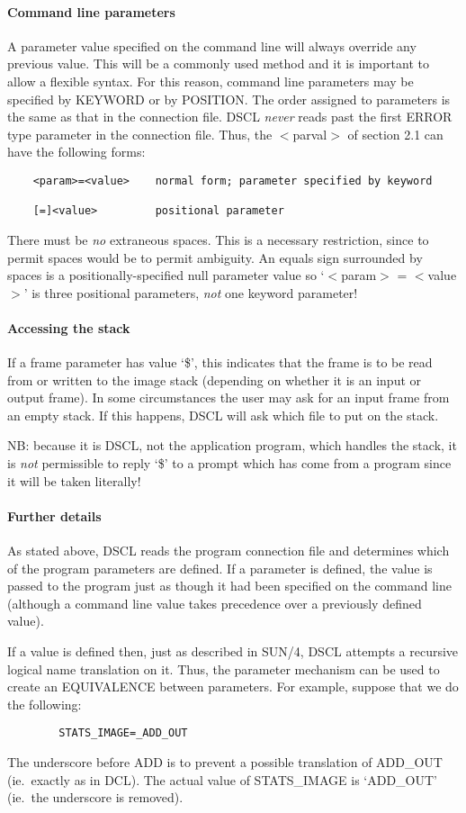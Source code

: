 \paragraph {Command line parameters}
A parameter value specified on the command line will always override any
previous value.
This will be a commonly used method and it is important to allow a flexible
syntax.
For this reason, command line parameters may be specified by KEYWORD or by
POSITION.
The order assigned to parameters is the same as that in the connection file.
DSCL {\em never} reads past the first ERROR type parameter in the connection
file.
Thus, the $<$parval$>$ of section 2.1 can have the following forms:
\begin{verbatim}
    <param>=<value>    normal form; parameter specified by keyword

    [=]<value>         positional parameter
\end{verbatim}
There must be {\em no} extraneous spaces.
This is a necessary restriction, since to permit spaces would be to permit
ambiguity.
An equals sign surrounded by spaces is a positionally-specified null parameter
value so `$<$param$>$ = $<$value$>$' is three positional parameters, {\em not}
one keyword parameter!
\paragraph {Accessing the stack}
If a frame parameter has value `\$', this indicates that the frame is
to be read from or written to the image stack (depending on whether it is an
input or output frame).
In some circumstances the user may ask for an input frame from an empty stack.
If this happens, DSCL will ask which file to put on the stack.

NB: because it is DSCL, not the application program, which handles the stack,
it is {\em not} permissible to reply `\$' to a prompt which has come from a
program since it will be taken literally!
\paragraph {Further details}
As stated above, DSCL reads the program connection file and determines which of
the program parameters are defined.
If a parameter is defined, the value is passed to the program just as
though it had been specified on the command line (although a command line value
takes precedence over a previously defined value).

If a value is defined then, just as described in SUN/4, DSCL attempts a
recursive logical name translation on it.
Thus, the parameter mechanism can be used to create an EQUIVALENCE between
parameters.
For example, suppose that we do the following:
\begin{verbatim}
        STATS_IMAGE=_ADD_OUT
\end{verbatim}
The underscore before ADD is to prevent a possible translation of ADD\_OUT
(ie.\ exactly as in DCL).
The actual value of STATS\_IMAGE is `ADD\_OUT' (ie.\ the underscore is removed).

